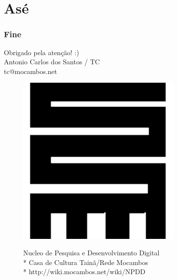 \documentclass{beamer}
\begin{document}
{%

 \section{Asé}

 \begin{frame}
  \frametitle{Fine}
  \begin{center}
   \huge Obrigado pela atenção! :) \\
   \vfill
   \large  
   Antonio Carlos dos Santos / TC \\
   \normalsize
   tc@mocambos.net
   \vfill
   \begin{figure}[htb]
     \begin{minipage}[c]{0.10\textwidth}
       \includegraphics[width=\textwidth]{./FIG/NPDD.pdf}
  \end{minipage}
  \begin{minipage}[c]{0.60\textwidth}
    \footnotesize
    Nucleo de Pesquisa e Desenvolvimento Digital \\*
    Casa de Cultura Tainã/Rede Mocambos\\*
    http://wiki.mocambos.net/wiki/NPDD
  \end{minipage}

\end{figure}
\end{center}
\end{frame}

} %
\end{document}
